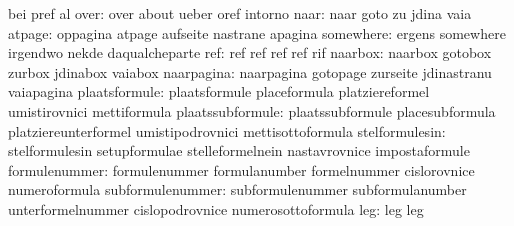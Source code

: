                                   bei                              pref
                                  al                               %
                            over: over                             about
                                  ueber                            oref
                                  intorno
                            naar: naar                             goto
                                  zu                               jdina
                                  vaia
                          atpage: oppagina                         atpage
                                  aufseite                         nastrane
                                  apagina
                       somewhere: ergens                           somewhere
                                  irgendwo                         nekde
                                  daqualcheparte
                             ref: ref                              ref
                                  ref                              ref
                                  rif
                         naarbox: naarbox                          gotobox
                                  zurbox                           jdinabox
                                  vaiabox                          %
                      naarpagina: naarpagina                       gotopage
                                  zurseite                         jdinastranu
                                  vaiapagina
                   plaatsformule: plaatsformule                    placeformula
                                  platziereformel                  umistirovnici
                                  mettiformula
                plaatssubformule: plaatssubformule                 placesubformula
                                  platziereunterformel             umistipodrovnici
                                  mettisottoformula
                  stelformulesin: stelformulesin                   setupformulae
                                  stelleformelnein                 nastavrovnice
                                  impostaformule
                   formulenummer: formulenummer                    formulanumber
                                  formelnummer                     cislorovnice
                                  numeroformula
                subformulenummer: subformulenummer                 subformulanumber
                                  unterformelnummer                cislopodrovnice
                                  numerosottoformula
                             leg: leg                              leg
